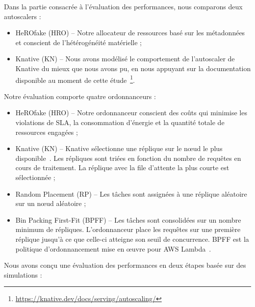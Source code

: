 Dans la partie consacrée à l'évaluation des performances, nous comparons deux autoscalers :

\begin{itemize}
    \item HeROfake (HRO) -- Notre allocateur de ressources basé sur les métadonnées et conscient de l'hétérogénéité matérielle ;
    \item Knative (KN) -- Nous avons modélisé le comportement de l'autoscaler de Knative du mieux que nous avons pu, en nous appuyant sur la documentation disponible au moment de cette étude~\footnote{\href{https://knative.dev/docs/serving/autoscaling/}{https://knative.dev/docs/serving/autoscaling/}}.
\end{itemize}

Notre évaluation comporte quatre ordonnanceurs :

\begin{itemize}
    \item HeROfake (HRO) -- Notre ordonnanceur conscient des coûts qui minimise les violations de SLA, la consommation d'énergie et la quantité totale de ressources engagées ;
    \item Knative (KN) -- Knative sélectionne une réplique sur le nœud le plus disponible~\cite{sureshENSUREEfficientScheduling2020}. Les répliques sont triées en fonction du nombre de requêtes en cours de traitement. La réplique avec la file d'attente la plus courte est sélectionnée ;
    \item Random Placement (RP) -- Les tâches sont assignées à une réplique aléatoire sur un nœud aléatoire ;
    \item Bin Packing First-Fit (BPFF) -- Les tâches sont consolidées sur un nombre minimum de répliques. L'ordonnanceur place les requêtes sur une première réplique jusqu'à ce que celle-ci atteigne son seuil de concurrence. BPFF est la politique d'ordonnancement mise en œuvre pour AWS Lambda~\cite{wangPeekingCurtainsServerlessb}.
\end{itemize}

Nous avons conçu une évaluation des performances en deux étapes basée sur des simulations :

